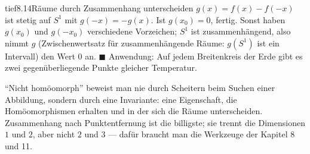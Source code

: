 \begin{loesungkarte}{tief}{8.14}{Räume durch Zusammenhang unterscheiden}
$g(x) = f(x) - f(-x)$ ist stetig auf $S^{1}$ mit $g(-x) = -g(x)$. Ist $g(x_0) = 0$, fertig. Sonst haben $g(x_0)$ und $g(-x_0)$ verschiedene Vorzeichen; $S^{1}$ ist zusammenhängend, also nimmt $g$ (Zwischenwertsatz für zusammenhängende Räume: $g(S^{1})$ ist ein Intervall) den Wert $0$ an. $\blacksquare$ Anwendung: Auf jedem Breitenkreis der Erde gibt es zwei gegenüberliegende Punkte gleicher Temperatur.
\begin{mitnehmen}\kastentext
\enquote{Nicht homöomorph} beweist man nie durch Scheitern beim Suchen einer Abbildung, sondern durch eine Invariante: eine Eigenschaft, die Homöomorphismen erhalten und in der sich die Räume unterscheiden. Zusammenhang nach Punktentfernung ist die billigste; sie trennt die Dimensionen $1$ und $2$, aber nicht $2$ und $3$ --- dafür braucht man die Werkzeuge der Kapitel 8 und 11.
\end{mitnehmen}
\end{loesungkarte}

